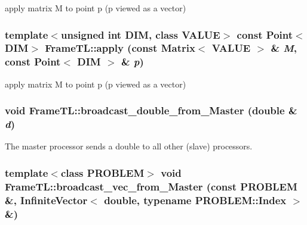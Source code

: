 apply matrix M to point p (p viewed as a vector) \hypertarget{namespaceFrameTL_110b0b11455f5d648c2cb3a7866f3900}{
\subsubsection[apply]{\setlength{\rightskip}{0pt plus 5cm}template$<$unsigned int DIM, class VALUE$>$ const Point$<$DIM$>$ FrameTL::apply (const Matrix$<$ VALUE $>$ \& {\em M}, \/  const Point$<$ DIM $>$ \& {\em p})}}
\label{namespaceFrameTL_110b0b11455f5d648c2cb3a7866f3900}


apply matrix M to point p (p viewed as a vector) \hypertarget{namespaceFrameTL_5b01ba18f76ca06fb77d8cbca90492e8}{
\subsubsection[broadcast\_\-double\_\-from\_\-Master]{\setlength{\rightskip}{0pt plus 5cm}void FrameTL::broadcast\_\-double\_\-from\_\-Master (double \& {\em d})}}
\label{namespaceFrameTL_5b01ba18f76ca06fb77d8cbca90492e8}


The master processor sends a double to all other (slave) processors. \hypertarget{namespaceFrameTL_99afa22a98a5b20d8326b2983bb19088}{
\subsubsection[broadcast\_\-vec\_\-from\_\-Master]{\setlength{\rightskip}{0pt plus 5cm}template$<$class PROBLEM$>$ void FrameTL::broadcast\_\-vec\_\-from\_\-Master (const PROBLEM \&, \/  InfiniteVector$<$ double, typename PROBLEM::Index $>$ \&)}}
\label{namespaceFrameTL_99afa22a98a5b20d8326b2983bb19088}


